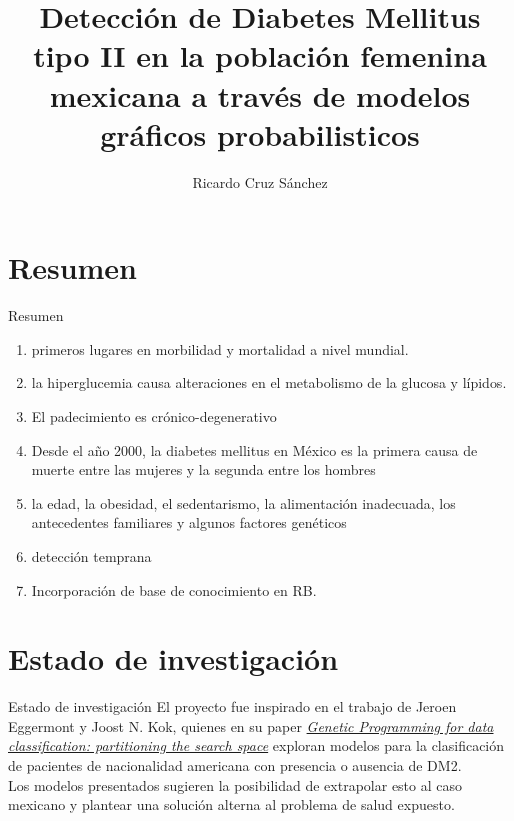 \documentclass[pdf]{beamer}
\title{Detecci\'on de Diabetes Mellitus tipo II en la poblaci\'on femenina mexicana a trav\'es de modelos gr\'aficos probabilisticos}
\author{Ricardo Cruz Sánchez}
\institute[CIMAT]{CIMAT}
\begin{document}
\begin{frame}
\titlepage
\end{frame}


\section{Resumen}

\begin{frame}{Resumen}
\begin{enumerate}
\item primeros lugares en morbilidad y mortalidad a nivel mundial.
\item la hiperglucemia causa alteraciones en el metabolismo de la glucosa y l\'ipidos.
\item El padecimiento es cr\'onico-degenerativo
\item Desde el a\~no 2000, la diabetes mellitus en M\'exico es la primera causa de muerte entre las mujeres y la segunda entre los hombres
\item la edad, la obesidad, el sedentarismo, la alimentación inadecuada, los antecedentes familiares y algunos factores gen\'eticos
\item detección temprana
\item Incorporación de base de conocimiento en RB.
\end{enumerate}
\end{frame}


\section{Estado de investigación}
\begin{frame}{Estado de investigación}
El proyecto fue inspirado en el trabajo de Jeroen Eggermont y Joost N. Kok, quienes en su paper \underline{\textit{Genetic Programming for data classification: partitioning the search space}} exploran modelos para la clasificaci\'on de pacientes de nacionalidad americana con presencia o ausencia de DM2.\\

Los modelos presentados sugieren la posibilidad de extrapolar esto al caso mexicano y plantear una soluci\'on alterna al problema de salud expuesto.\\
\end{frame}
\end{document}
